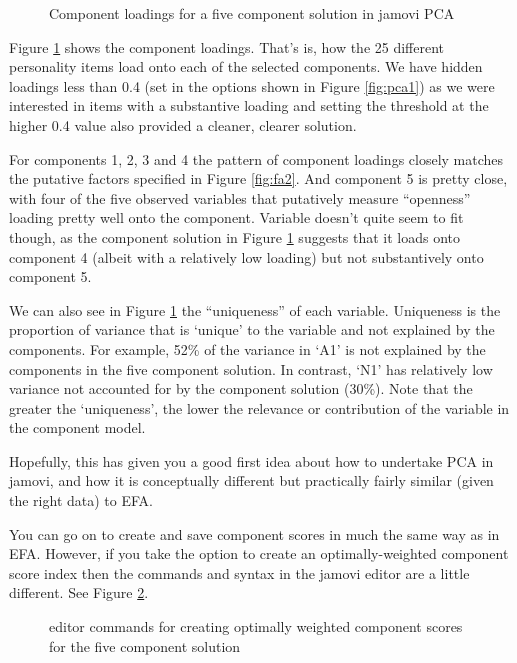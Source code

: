 \begin{figure}[!htb]
\begin{center}
\caption{Component loadings for a five component solution in jamovi PCA}
\label{fig:pca5}
\HR
\end{center}
\end{figure}

Figure \ref{fig:pca5} shows the component loadings. That's is, how the 25 different personality items load onto each of the selected components. We have hidden loadings less than 0.4 (set in the options shown in Figure \ref{fig:pca1}) as we were interested in items with a substantive loading and setting the threshold at the higher 0.4 value also provided a cleaner, clearer solution. 

For components 1, 2, 3 and 4 the pattern of component loadings closely matches the putative factors specified in Figure \ref{fig:fa2}. And component 5 is pretty close, with four of the five observed variables that putatively measure “openness” loading pretty well onto the component. Variable  doesn’t quite seem to fit though, as the component solution in Figure \ref{fig:pca5} suggests that it loads onto component 4 (albeit with a relatively low loading) but not substantively onto component 5.

We can also see in Figure \ref{fig:pca5} the “uniqueness” of each variable. Uniqueness is the proportion of variance that is ‘unique’ to the variable and not explained by the components. For example, 52\% of the variance in ‘A1’ is not explained by the components in the five component solution. In contrast, ‘N1’ has relatively low variance not accounted for by the component solution (30\%). Note that the greater the ‘uniqueness’, the lower the relevance or contribution of the variable in the component model. 

Hopefully, this has given you a good first idea about how to undertake PCA in jamovi, and how it is conceptually different but practically fairly similar (given the right data) to EFA.

You can go on to create and save component scores in much the same way as in EFA. However, if you take the option to create an optimally-weighted component score index then the commands and syntax in the jamovi  editor are a little different. See Figure \ref{fig:pca6}. 

\begin{figure}[!htb]
\begin{center}
\caption{ editor commands for creating optimally weighted component scores for the five component solution}
\label{fig:pca6}
\HR
\end{center}
\end{figure}


